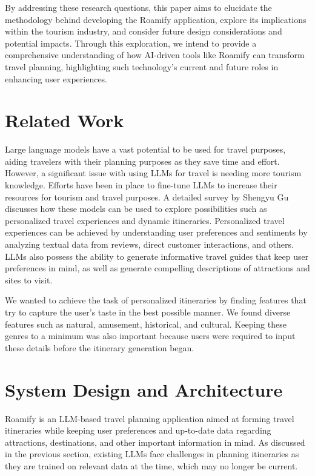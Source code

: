 \documentclass[sigconf,authordraft]{acmart}
\begin{document}
  By addressing these research questions, this paper aims to elucidate the methodology behind developing the Roamify application, explore its implications within the tourism industry, and consider future design considerations and potential impacts. Through this exploration, we intend to provide a comprehensive understanding of how AI-driven tools like Roamify can transform travel planning, highlighting such technology's current and future roles in enhancing user experiences.

\section{Related Work}
  Large language models have a vast potential to be used for travel purposes, aiding travelers with their planning purposes as they save time and effort. However, a significant issue with using LLMs for travel is needing more tourism knowledge. Efforts have been in place to fine-tune LLMs to increase their resources for tourism and travel purposes\cite{ref3}. A detailed survey by Shengyu Gu discusses how these models can be used to explore possibilities such as personalized travel experiences and dynamic itineraries\cite{ref4}. Personalized travel experiences can be achieved by understanding user preferences and sentiments by analyzing textual data from reviews, direct customer interactions, and others. LLMs also possess the ability to generate informative travel guides that keep user preferences in mind, as well as generate compelling descriptions of attractions and sites to visit.

  We wanted to achieve the task of personalized itineraries by finding features that try to capture the user's taste in the best possible manner. We found diverse features such as natural, amusement, historical, and cultural. Keeping these genres to a minimum was also important because users were required to input these details before the itinerary generation began.

\section{System Design and Architecture}
  Roamify is an LLM-based travel planning application aimed at forming travel itineraries while keeping user preferences and up-to-date data regarding attractions, destinations, and other important information in mind. As discussed in the previous section, existing LLMs face challenges in planning itineraries as they are trained on relevant data at the time, which may no longer be current.
\end{document}
